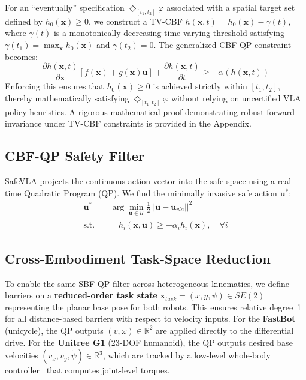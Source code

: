 \documentclass[conference]{IEEEtran}
\begin{document}
For an ``eventually'' specification $\Diamond_{[t_1, t_2]} \varphi$ associated with a spatial target set defined by $h_0(\mathbf{x}) \ge 0$, we construct a TV-CBF $h(\mathbf{x}, t) = h_0(\mathbf{x}) - \gamma(t)$, where $\gamma(t)$ is a monotonically decreasing time-varying threshold satisfying $\gamma(t_1) = \max_{\mathbf{x}} h_0(\mathbf{x})$ and $\gamma(t_2) = 0$. The generalized CBF-QP constraint becomes:
\begin{equation}
    \frac{\partial h(\mathbf{x}, t)}{\partial \mathbf{x}} [f(\mathbf{x}) + g(\mathbf{x})\mathbf{u}] + \frac{\partial h(\mathbf{x}, t)}{\partial t} \ge -\alpha(h(\mathbf{x}, t))
\end{equation}
Enforcing this ensures that $h_0(\mathbf{x}) \ge 0$ is achieved strictly within $[t_1, t_2]$, thereby mathematically satisfying $\Diamond_{[t_1, t_2]} \varphi$ without relying on uncertified VLA policy heuristics. A rigorous mathematical proof demonstrating robust forward invariance under TV-CBF constraints is provided in the Appendix.

\subsection{CBF-QP Safety Filter}
SafeVLA projects the continuous action vector into the safe space using a real-time Quadratic Program (QP). We find the minimally invasive safe action $\mathbf{u}^*$:
\begin{align}
    \mathbf{u}^* =& \arg \min_{\mathbf{u} \in \mathcal{U}} \frac{1}{2} || \mathbf{u} - \mathbf{u}_{vla} ||^2 \\
    \text{s.t.}& \quad \dot{h}_i(\mathbf{x}, \mathbf{u}) \ge -\alpha_i h_i(\mathbf{x}), \quad \forall i
\end{align}

\subsection{Cross-Embodiment Task-Space Reduction}
To enable the same SBF-QP filter across heterogeneous kinematics, we define barriers on a \textbf{reduced-order task state} $\mathbf{x}_{task} = (x, y, \psi) \in SE(2)$ representing the planar base pose for both robots. This ensures relative degree~1 for all distance-based barriers with respect to velocity inputs. For the \textbf{FastBot} (unicycle), the QP outputs $(v, \omega) \in \mathbb{R}^2$ are applied directly to the differential drive. For the \textbf{Unitree G1} (23-DOF humanoid), the QP outputs desired base velocities $(v_x, v_y, \dot{\psi}) \in \mathbb{R}^3$, which are tracked by a low-level whole-body controller~\cite{margolis2022walkthesewaysim} that computes joint-level torques.
\end{document}
